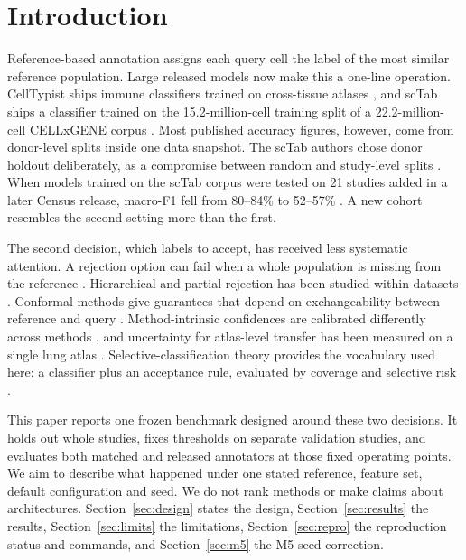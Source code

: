 \documentclass[11pt]{article}
\begin{document}
\section{Introduction}

Reference-based annotation assigns each query cell the label of the most similar reference population. Large released models now make this a one-line operation. CellTypist ships immune classifiers trained on cross-tissue atlases \citep{dominguezconde2022celltypist,celltypistmodels}, and scTab ships a classifier trained on the 15.2-million-cell training split of a 22.2-million-cell CELLxGENE corpus \citep{fischer2024sctab}. Most published accuracy figures, however, come from donor-level splits inside one data snapshot. The scTab authors chose donor holdout deliberately, as a compromise between random and study-level splits \citep{fischer2024sctab}. When models trained on the scTab corpus were tested on 21 studies added in a later Census release, macro-F1 fell from 80--84\% to 52--57\% \citep{cultrera2026hce}. A new cohort resembles the second setting more than the first.

The second decision, which labels to accept, has received less systematic attention. A rejection option can fail when a whole population is missing from the reference \citep{abdelaal2019}. Hierarchical and partial rejection has been studied within datasets \citep{theunissen2024}. Conformal methods give guarantees that depend on exchangeability between reference and query \citep{lopezdecastro2025}. Method-intrinsic confidences are calibrated differently across methods \citep{ergen2024popv}, and uncertainty for atlas-level transfer has been measured on a single lung atlas \citep{engelmann2022}. Selective-classification theory provides the vocabulary used here: a classifier plus an acceptance rule, evaluated by coverage and selective risk \citep{geifman2017}.

This paper reports one frozen benchmark designed around these two decisions. It holds out whole studies, fixes thresholds on separate validation studies, and evaluates both matched and released annotators at those fixed operating points. We aim to describe what happened under one stated reference, feature set, default configuration and seed. We do not rank methods or make claims about architectures. Section~\ref{sec:design} states the design, Section~\ref{sec:results} the results, Section~\ref{sec:limits} the limitations, Section~\ref{sec:repro} the reproduction status and commands, and Section~\ref{sec:m5} the M5 seed correction.
\end{document}
